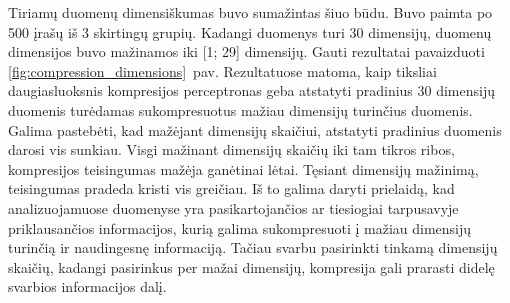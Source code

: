 \documentclass{VUMIFPSbakalaurinis}
\begin{document}
Tiriamų duomenų dimensiškumas buvo sumažintas šiuo būdu.
Buvo paimta po 500 įrašų iš 3 skirtingų grupių.
Kadangi duomenys turi 30 dimensijų, duomenų dimensijos buvo mažinamos iki [1; 29] dimensijų.
Gauti rezultatai pavaizduoti \ref{fig:compression_dimensions}~pav.
Rezultatuose matoma, kaip tiksliai daugiasluoksnis kompresijos perceptronas geba atstatyti pradinius 30 dimensijų duomenis turėdamas sukompresuotus mažiau dimensijų turinčius duomenis.
Galima pastebėti, kad mažėjant dimensijų skaičiui, atstatyti pradinius duomenis darosi vis sunkiau.
Visgi mažinant dimensijų skaičių iki tam tikros ribos, kompresijos teisingumas mažėja ganėtinai lėtai.
Tęsiant dimensijų mažinimą, teisingumas pradeda kristi vis greičiau.
Iš to galima daryti prielaidą, kad analizuojamuose duomenyse yra pasikartojančios ar tiesiogiai tarpusavyje priklausančios informacijos, kurią galima sukompresuoti į mažiau dimensijų turinčią ir naudingesnę informaciją.
Tačiau svarbu pasirinkti tinkamą dimensijų skaičių, kadangi pasirinkus per mažai dimensijų, kompresija gali prarasti didelę svarbios informacijos dalį.
\end{document}
